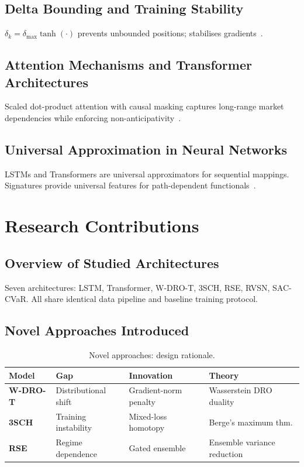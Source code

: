 \documentclass[11pt]{article}
\begin{document}
\subsection{Delta Bounding and Training Stability}
$\delta_k = \delta_{\max}\tanh(\cdot)$ prevents unbounded positions; stabilises gradients~\citep{kozyra2019deep}.

\subsection{Attention Mechanisms and Transformer Architectures}
Scaled dot-product attention with causal masking captures long-range market dependencies while enforcing non-anticipativity~\citep{vaswani2017attention}.

\subsection{Universal Approximation in Neural Networks}
LSTMs and Transformers are universal approximators for sequential mappings. Signatures provide universal features for path-dependent functionals~\citep{lyons1998differential}.

\section{Research Contributions}

\subsection{Overview of Studied Architectures}
Seven architectures: LSTM, Transformer, W-DRO-T, 3SCH, RSE, RVSN, SAC-CVaR. All share identical data pipeline and baseline training protocol.

\subsection{Novel Approaches Introduced}

\begin{table}[H]\centering\small
\caption{Novel approaches: design rationale.}
\begin{tabular}{@{}llll@{}}
\toprule
\textbf{Model} & \textbf{Gap} & \textbf{Innovation} & \textbf{Theory} \\\midrule
\textcolor{ppurple}{\textbf{W-DRO-T}} & Distributional shift & Gradient-norm penalty & Wasserstein DRO duality \\
\textcolor{porange}{\textbf{3SCH}} & Training instability & Mixed-loss homotopy & Berge's maximum thm. \\
\textcolor{pblue}{\textbf{RSE}} & Regime dependence & Gated ensemble & Ensemble variance reduction \\
\bottomrule
\end{tabular}
\end{table}
\end{document}
